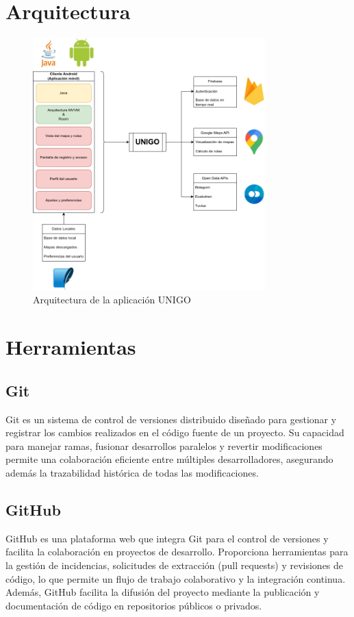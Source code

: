 \documentclass[a4paper,12pt]{report}
\begin{document}
  \chapter{Arquitectura}
    \begin{figure}[H]
      \centering
      \includegraphics[width=0.8\textwidth]{../.img/arquitectura.png}
      \caption{Arquitectura de la aplicación UNIGO}
      \label{fig:arquitectura}
    \end{figure}
  \chapter{Herramientas}
    \section*{Git}
      Git es un sistema de control de versiones distribuido diseñado para gestionar y registrar los cambios realizados en el código fuente de un proyecto. Su capacidad para manejar ramas, fusionar desarrollos paralelos y revertir modificaciones permite una colaboración eficiente entre múltiples desarrolladores, asegurando además la trazabilidad histórica de todas las modificaciones.
    \section*{GitHub}
      GitHub es una plataforma web que integra Git para el control de versiones y facilita la colaboración en proyectos de desarrollo. Proporciona herramientas para la gestión de incidencias, solicitudes de extracción (pull requests) y revisiones de código, lo que permite un flujo de trabajo colaborativo y la integración continua. Además, GitHub facilita la difusión del proyecto mediante la publicación y documentación de código en repositorios públicos o privados.
\end{document}
